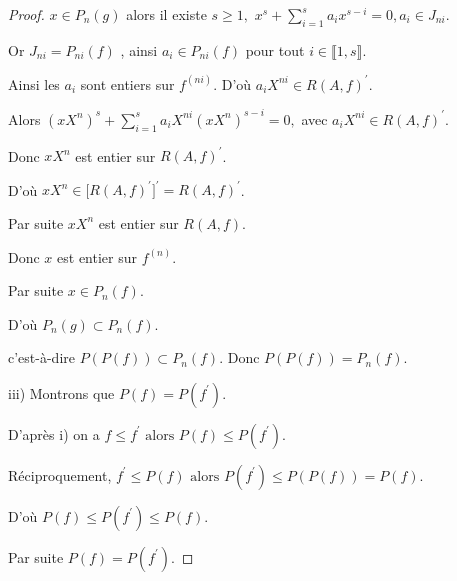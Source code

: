\begin{proof}
	$x\in P_{n}(g)$ alors il existe $s\geq 1,$ $x^{s}+\sum\limits_{i=1}^{s}a_{i}x^{s-i}=0,a_{i}\in J_{ni}$.
	
	Or $J_{ni}=P_{ni}(f)$ , ainsi $a_{i}\in P_{ni}(f)$ pour tout $i\in \llbracket 1, s \rrbracket.$
	
	Ainsi les $a_{i}$ sont entiers sur $f^{(ni)}.$ D'où $a_{i}X^{ni}\in R(A,f)^{\prime }$.
	
	Alors $(xX^{n})^{s}+\sum\limits_{i=1}^{s}a_{i}X^{ni}(xX^{n})^{s-i}=0,$ avec 
	$a_{i}X^{ni}\in R(A,f)^{\prime }$.
	
	Donc $xX^{n}$ est entier sur $R(A,f)^{\prime }$.
	
	D'où $xX^{n}\in \lbrack R(A,f)^{\prime }]^{\prime }=R(A,f)^{\prime }$.
	
	Par suite $xX^{n}$ est entier sur $R(A,f)$.
	
	Donc $x$ est entier sur $f^{(n)}$.
	
	Par suite $x\in P_{n}(f).$
	
	D'où $P_{n}(g)\subset P_{n}(f).$
	
	c'est-\`{a}-dire $P(P(f))\subset P_{n}(f).$ Donc $P(P(f))=P_{n}(f).$
	
	iii) Montrons que $P(f)=P(f^{\prime })$.
	
	D'après i) on a $f\leq f^{\prime }\text{ alors } P(f)\leq P(f^{\prime })$.
	
	Réciproquement, $f^{\prime }\leq P(f)\text{ alors } P(f^{\prime })\leq
	P(P(f))=P(f)$.
	
	D'où $P(f)\leq P(f^{\prime })\leq P(f)$.
	
	Par suite $P(f)=P(f^{\prime })$.
\end{proof}


